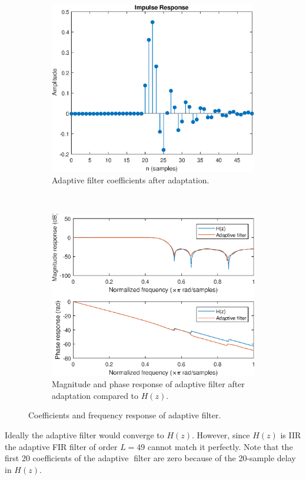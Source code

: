 \documentclass{article}
\begin{document}
\begin{description}
\begin{figure}[h!]
	\centering
	\begin{subfigure}[h!]{0.5\textwidth}
		\includegraphics[width=\textwidth]{figs/part1_coeff.eps}
		\caption{Adaptive filter coefficients after adaptation.}
	\end{subfigure}%
	~ %
	\begin{subfigure}[h!]{0.5\textwidth}
		\includegraphics[width=\textwidth]{figs/part1_freqz.eps}
		\caption{Magnitude and phase response of adaptive filter after adaptation compared to $H(z)$.}
	\end{subfigure}
	\caption{Coefficients and frequency response of adaptive filter.}
\end{figure}


Ideally the adaptive filter would converge to $H(z)$. However, since $H(z)$ is IIR the adaptive FIR filter of order $L = 49$ cannot match it perfectly. Note that the first 20 coefficients of the adaptive filter are zero because of the 20-sample delay in $H(z)$.

\end{description}
\end{document}
